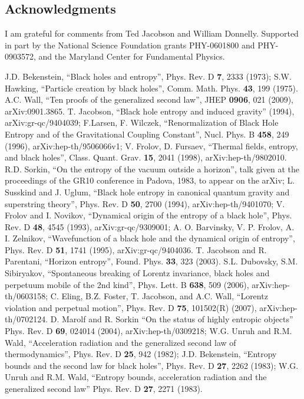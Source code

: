 \documentclass{article}
\begin{document}
\small
\subsection*{Acknowledgments}
I am grateful for comments from Ted Jacobson and William Donnelly.  Supported in part by the National Science Foundation grants PHY-0601800 and PHY-0903572, and the Maryland Center for Fundamental Physics.
\normalsize

\begin{thebibliography}{99}
J.D. Bekenstein, ``Black holes and entropy'', Phys. Rev. D \textbf{7}, 2333 (1973); S.W. Hawking, ``Particle creation by black holes'', Comm. Math. Phys. \textbf{43}, 199 (1975).
A.C. Wall, ``Ten proofs of the generalized second law'', JHEP \textbf{0906}, 021 (2009), arXiv:0901.3865.
T. Jacobson, ``Black hole entropy and induced gravity'' (1994), arXiv:gr-qc/9404039; 
F.Larsen, F. Wilczek, ``Renormalization of Black Hole Entropy and of the Gravitational Coupling Constant'', Nucl. Phys. B \textbf{458}, 249 (1996), arXiv:hep-th/9506066v1; V. Frolov, D. Fursaev, ``Thermal fields, entropy, and black holes'', Class. Quant. Grav. \textbf{15}, 2041 (1998), arXiv:hep-th/9802010.
R.D. Sorkin, ``On the entropy of the vacuum outside a horizon'', talk given at the proceedings of the GR10 conference in Padova, 1983, to appear on the arXiv; L. Susskind and J. Uglum, ``Black hole entropy in canonical quantum gravity and superstring theory'', Phys. Rev. D \textbf{50}, 2700 (1994), arXiv:hep-th/9401070; V. Frolov and I. Novikov, ``Dynamical origin of the entropy of a black hole'', Phys. Rev. D \textbf{48}, 4545 (1993), arXiv:gr-qc/9309001; A. O. Barvinsky, V. P. Frolov, A. I. Zelnikov, ``Wavefunction of a black hole and the dynamical origin of entropy'', Phys. Rev. D \textbf{51}, 1741 (1995), arXiv:gr-qc/9404036.
T. Jacobson and R. Parentani, ``Horizon entropy'', Found. Phys. \textbf{33}, 323 (2003).
S.L. Dubovsky, S.M. Sibiryakov, ``Spontaneous breaking of Lorentz invariance, black holes and perpetuum mobile of the 2nd kind'', Phys. Lett. B \textbf{638}, 509 (2006), arXiv:hep-th/0603158; C. Eling, B.Z. Foster, T. Jacobson, and A.C. Wall, ``Lorentz violation and perpetual motion'', Phys. Rev. D \textbf{75}, 101502(R) (2007), arXiv:hep-th/0702124.
D. Marolf and R. Sorkin ``On the status of highly entropic objects'' Phys. Rev. D \textbf{69}, 024014 (2004), arXiv:hep-th/0309218; W.G. Unruh and R.M. Wald, ``Acceleration radiation and the generalized second law of thermodynamics'', Phys. Rev. D \textbf{25}, 942 (1982); J.D. Bekenstein, ``Entropy bounds and the second law for black holes'', Phys. Rev. D \textbf{27}, 2262 (1983); W.G. Unruh and R.M. Wald, ``Entropy bounds, acceleration radiation and the generalized second law'' Phys. Rev. D \textbf{27}, 2271 (1983).

\end{thebibliography}
\end{document}
